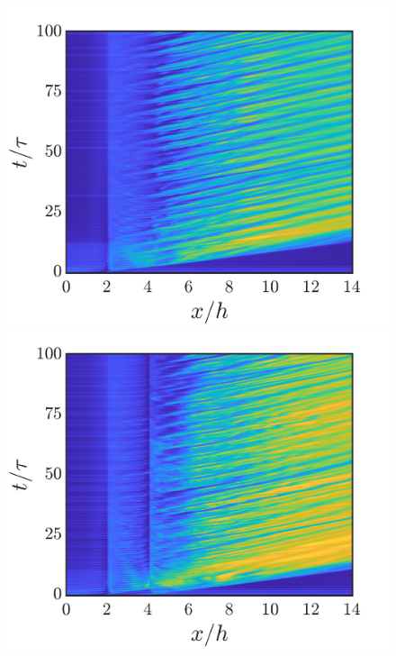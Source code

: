 \documentclass[reprint,a4paper,fleqn]{cas-dc} %
\begin{document}
\begin{figure}[t]
\begin{minipage}[c]{0.24\linewidth}
				\includegraphics[width=1\linewidth,trim={1.6cm 2cm 2cm 1cm},clip]{Figures/MI_HL/spcaeTime_M_Singleb.png}
				\includegraphics[width=1\linewidth,trim={1.6cm 2cm 2cm 1cm},clip]{Figures/MI_HL/spcaeTime_M_4b.png}

\end{minipage}
\end{figure}
\end{document}
